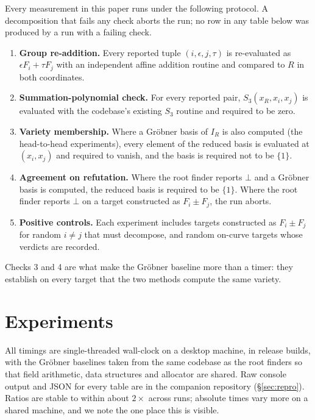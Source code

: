 \documentclass[10pt,a4paper]{article}
\theoremstyle{remark}
\newcommand{\Sem}[1]{S_{#1}}
\begin{document}
Every measurement in this paper runs under the following protocol. A
decomposition that fails any check aborts the run; no row in any table
below was produced by a run with a failing check.

\begin{enumerate}
\item \textbf{Group re-addition.} Every reported tuple
  $(i, \epsilon, j, \tau)$ is re-evaluated as $\epsilon F_i + \tau F_j$
  with an independent affine addition routine and compared to $R$ in
  both coordinates.
\item \textbf{Summation-polynomial check.} For every reported pair,
  $\Sem{3}(x_R, x_i, x_j)$ is evaluated with the codebase's existing
  $\Sem{3}$ routine and required to be zero.
\item \textbf{Variety membership.} Where a Gr\"obner basis of $I_R$ is
  also computed (the head-to-head experiments), every element of the
  reduced basis is evaluated at $(x_i, x_j)$ and required to vanish, and
  the basis is required not to be $\{1\}$.
\item \textbf{Agreement on refutation.} Where the root finder reports
  $\bot$ and a Gr\"obner basis is computed, the reduced basis is
  required to be $\{1\}$. Where the root finder reports $\bot$ on a
  target constructed as $F_i \pm F_j$, the run aborts.
\item \textbf{Positive controls.} Each experiment includes targets
  constructed as $F_i \pm F_j$ for random $i \neq j$ that must
  decompose, and random on-curve targets whose verdicts are recorded.
\end{enumerate}

Checks 3 and 4 are what make the Gr\"obner baseline more than a timer:
they establish on every target that the two methods compute the same
variety.

\section{Experiments}
\label{sec:experiments}

All timings are single-threaded wall-clock on a desktop machine, in
release builds, with the Gr\"obner baselines taken from the same
codebase as the root finders so that field arithmetic, data structures
and allocator are shared. Raw console output and JSON for every table
are in the companion repository (\S\ref{sec:repro}). Ratios are stable
to within about $2\times$ across runs; absolute times vary more on a
shared machine, and we note the one place this is visible.
\end{document}
